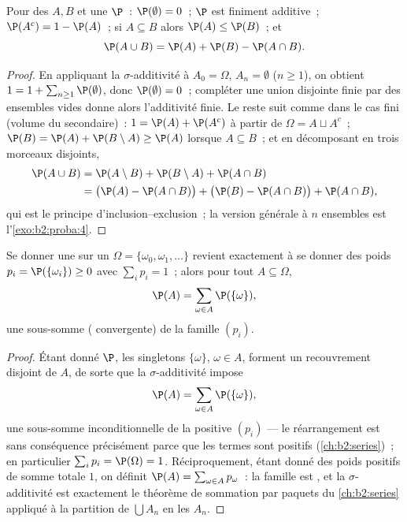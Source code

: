 \begin{proposition}\label{prop:b2:proba:rules}
Pour des  $A, B$ et une  $\P$~:
$\P(\emptyset) = 0$~; $\P$ est finiment additive~; $\P(A^c) = 1 -
\P(A)$~; si $A \subseteq B$ alors $\P(A) \leq \P(B)$~; et
\[
\P(A \cup B) = \P(A) + \P(B) - \P(A \cap B) .
\]
\end{proposition}

\begin{proof}
En appliquant la $\sigma$-additivité à $A_0 = \Omega$, $A_n = \emptyset$
($n \geq 1$), on obtient $1 = 1 + \sum_{n\geq1}\P(\emptyset)$, donc
$\P(\emptyset) = 0$~; compléter une union disjointe finie par des
ensembles vides donne alors l'additivité finie. Le reste suit comme dans
le cas fini (volume du secondaire)~: $1 = \P(A) + \P(A^c)$ à partir de
$\Omega = A \sqcup A^c$~; $\P(B) = \P(A) + \P(B \setminus A)
\geq \P(A)$ lorsque $A \subseteq B$~; et en décomposant en trois
morceaux disjoints,
\begin{align*}
\P(A \cup B) &= \P(A \setminus B) + \P(B \setminus A) +
\P(A \cap B)\\
&= \bigl(\P(A) - \P(A\cap B)\bigr) + \bigl(\P(B) - \P(A\cap
B)\bigr) + \P(A \cap B),
\end{align*}
qui est le principe d'inclusion--exclusion~; la version générale à
$n$ ensembles est l'\cref{exo:b2:proba:4}.
\end{proof}

\begin{proposition}\label{prop:b2:proba:distribution}
Se donner une  sur un $\Omega =
\{\omega_0, \omega_1, \dots\}$  revient exactement à se donner
des poids $p_i = \P(\{\omega_i\}) \geq 0$ avec $\sum_i p_i = 1$~; alors pour
tout $A \subseteq \Omega$,
\[
\P(A) = \sum_{\omega \in A} \P(\{\omega\}) ,
\]
une sous-somme ( convergente) de la famille $(p_i)$.
\end{proposition}

\begin{proof}
Étant donné $\P$, les singletons $\{\omega\}$, $\omega \in A$, forment un
recouvrement disjoint  de $A$, de sorte que la
$\sigma$-additivité impose
\[
\P(A) = \sum_{\omega\in A}\P(\{\omega\}),
\]
une sous-somme inconditionnelle de la  positive
$(p_i)$ --- le réarrangement est sans conséquence précisément parce que les
termes sont positifs (\cref{ch:b2:series})~; en particulier
$\sum_ip_i = \P(\Omega) = 1$.
Réciproquement, étant donné des poids positifs de somme totale $1$, on
définit $\P(A) = \sum_{\omega \in A}p_\omega$~: la famille est , et
la $\sigma$-additivité est exactement le théorème de sommation par paquets
du \cref{ch:b2:series} appliqué à la partition de $\bigcup A_n$
en les $A_n$.
\end{proof}

